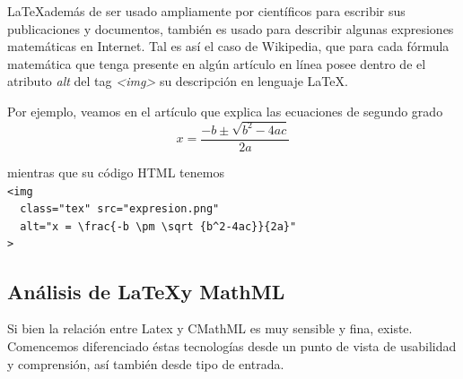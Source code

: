 \LaTeX además de ser usado ampliamente por científicos para escribir sus publicaciones y documentos, también es usado para describir
algunas expresiones matemáticas en Internet. Tal es así el caso de Wikipedia, que para cada fórmula matemática que tenga presente en algún artículo en línea posee dentro de el atributo \textit{alt} del tag \textit{<img>}
su descripción en lenguaje \LaTeX.

Por ejemplo, veamos en el artículo que explica las ecuaciones de segundo grado %
$$x = \frac{-b \pm \sqrt {b^2-4ac}}{2a}$$

 mientras que su código HTML tenemos
\\
\verb|<img|\\
\verb|  class="tex" src="expresion.png"|\\
\verb|  alt="x = \frac{-b \pm \sqrt {b^2-4ac}}{2a}"|\\
\verb|>|

\subsection{Análisis de \LaTeX y MathML}

Si bien la relación entre Latex y CMathML es muy sensible y fina, existe. Comencemos diferenciado éstas tecnologías desde un punto de vista de usabilidad y comprensión, así también desde tipo de entrada.

